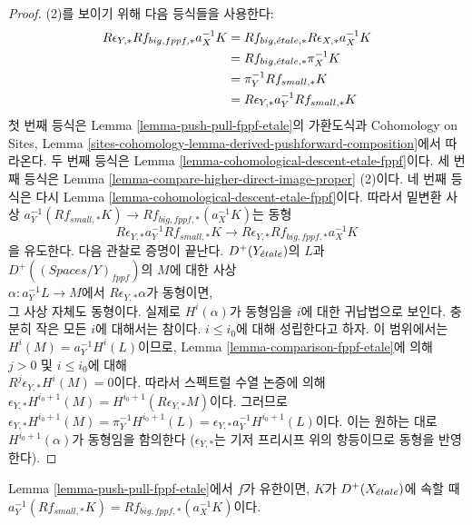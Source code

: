 \begin{proof}
\medskip\noindent
(2)를 보이기 위해 다음 등식들을 사용한다:
\begin{align*}
R\epsilon_{Y, *}Rf_{big, fppf, *}a_X^{-1}K
& =
Rf_{big, {\acute{e}tale}, *}R\epsilon_{X, *}a_X^{-1}K \\
& =
Rf_{big, {\acute{e}tale}, *}\pi_X^{-1}K \\
& =
\pi_Y^{-1}Rf_{small, *}K \\
& =
R\epsilon_{Y, *} a_Y^{-1}Rf_{small, *}K
\end{align*}
첫 번째 등식은 Lemma \ref{lemma-push-pull-fppf-etale}의 가환도식과
Cohomology on Sites, Lemma
\ref{sites-cohomology-lemma-derived-pushforward-composition}에서 따라온다.
두 번째 등식은 Lemma \ref{lemma-cohomological-descent-etale-fppf}이다.
세 번째 등식은 Lemma \ref{lemma-compare-higher-direct-image-proper} (2)이다.
네 번째 등식은 다시 Lemma
\ref{lemma-cohomological-descent-etale-fppf}이다. 따라서 밑변환 사상
$a_Y^{-1}(Rf_{small, *}K) \to Rf_{big, fppf, *}(a_X^{-1}K)$는 동형
$$
R\epsilon_{Y, *}a_Y^{-1}Rf_{small, *}K \to
R\epsilon_{Y, *}Rf_{big, fppf, *}a_X^{-1}K
$$
을 유도한다. 다음 관찰로 증명이 끝난다. $D^+(Y_{\acute{e}tale})$의 $L$과\\
$D^+((\textit{Spaces}/Y)_{fppf})$의 $M$에 대한 사상\\
$\alpha : a_Y^{-1}L \to M$에서 $R\epsilon_{Y, *}\alpha$가 동형이면,\\
그 사상 자체도 동형이다. 실제로 $H^i(\alpha)$가 동형임을 $i$에 대한
귀납법으로 보인다. 충분히 작은 모든 $i$에 대해서는 참이다.
$i \leq i_0$에 대해 성립한다고 하자. 이 범위에서는
$H^i(M) = a_Y^{-1}H^i(L)$이므로, Lemma
\ref{lemma-comparison-fppf-etale}에 의해 $j > 0$ 및 $i \leq i_0$에 대해\\
$R^j\epsilon_{Y, *}H^i(M) = 0$이다. 따라서 스펙트럴 수열 논증에 의해\\
$\epsilon_{Y, *}H^{i_0 + 1}(M) = H^{i_0 + 1}(R\epsilon_{Y, *}M)$이다.
그러므로\\
$\epsilon_{Y, *}H^{i_0 + 1}(M) = \pi_Y^{-1}H^{i_0 + 1}(L) =
\epsilon_{Y, *}a_Y^{-1}H^{i_0 + 1}(L)$이다. 이는 원하는 대로
$H^{i_0 + 1}(\alpha)$가 동형임을 함의한다
($\epsilon_{Y, *}$는 기저 프리시프 위의 항등이므로 동형을 반영한다).
\end{proof}

\begin{lemma}
\label{lemma-finite-push-pull-fppf-etale}
Lemma \ref{lemma-push-pull-fppf-etale}에서 $f$가 유한이면,
$K$가 $D^+(X_{\acute{e}tale})$에 속할 때
$a_Y^{-1}(Rf_{small, *}K) = Rf_{big, fppf, *}(a_X^{-1}K)$이다.
\end{lemma}

